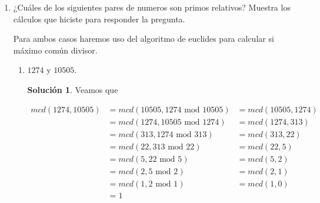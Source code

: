 \documentclass[letterpaper]{article}
\theoremstyle{definition}
\theoremstyle{lemathm}
\theoremstyle{lemathm}
\newtheorem{sol}{Solución}
\theoremstyle{lemathm}
\theoremstyle{lemademthm}
\newcommand{\pars}[1]{\left( #1 \right) }
\newcommand{\inprod}[1]{\left\langle #1 \right\rangle }
\newcommand{\1}{\mathbbm{1}}
\begin{document}
\begin{enumerate}
\begin{proof}
				Si $T$ es decidible entonces existe $MT \ M$ talque $M$ decide a $T$. Veamos lo siguiente

				$S =$ "Sobre la entrada $\inprod{M,\omega}$:
				\begin{enumerate}
					\item Sea $TM \ R =$ "Sobre la entrada $\omega'$
					\begin{enumerate}
						\item Si $x = 01$ acepta.
						\item Si $x = 10$ y $M$ acepta $\omega$ entonces acepta.
						\item Si no rechaza.
					\end{enumerate}
					\item 
					\item Ejecuta $T_2$ con la cadena $\omega$ si acepta entonces acepta, si no rechaza.
				\end{enumerate}

				Notemos que si $\inprod{M,\omega} \in A_{MT}$ entonces $M$ acepta $\omega$ por lo que $L\pars{S\inprod{M,\omega}} = \pars{01,10}$, por lo que $\inprod{S}\in T$; ahora si $\inprod{M,\omega} \in A_{MT}$ entonces $M$ no acepta $\omega$ por lo que $L\pars{S\inprod{M,\omega}} = \pars{01}$, por lo que $\inprod{S}\not\in T$, por contrapositiva concluimos que $\inprod{M,\omega} \in A_{MT}$ si y sólo si $\inprod{S}\in T$, lo cual como habiamos dicho es una contradicción puesto que $A_{TM}$ es indecidible.

			\end{proof}

			\item ¿Cuáles de los siguientes pares de numeros son primos relativos? Muestra los cálculos que hiciste para responder la pregunta.
			
			Para ambos casos haremos uso del algoritmo de euclides para calcular si máximo común divisor.

			\begin{enumerate}
				\item $1274$ y $10505$.
				
				\begin{sol}
					Veamos que

					\begin{align*}
						mcd\pars{1274,10505} &= mcd\pars{10505, 1274 \text{ mod } 10505} &= mcd\pars{10505, 1274}\\
						&= mcd\pars{1274, 10505 \text{ mod } 1274} &= mcd\pars{1274, 313}\\
						&= mcd\pars{313, 1274 \text{ mod } 313} &= mcd\pars{313, 22}\\
						&= mcd\pars{22, 313 \text{ mod } 22} &= mcd\pars{22, 5}\\
						&= mcd\pars{5, 22 \text{ mod } 5} &= mcd\pars{5, 2}\\
						&= mcd\pars{2, 5 \text{ mod } 2} &= mcd\pars{2, 1}\\
						&= mcd\pars{1, 2 \text{ mod } 1} &= mcd\pars{1, 0}\\
						&= 1
					\end{align*}


\end{sol}
\end{enumerate}
\end{enumerate}
\end{document}
